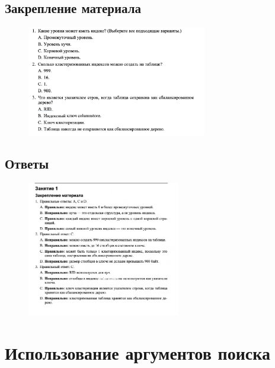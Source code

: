 \subsection*{Закрепление материала}

\begin{figure}[h!]
	\begin{center}
		\includegraphics[width=0.7\textwidth]{img/zakrep43.png}
	\end{center}
	\captionsetup{justification=centering}
\end{figure}
\newpage

\subsection*{Ответы}

\begin{figure}[h!]
	\begin{center}
		\includegraphics[width=0.6\textwidth]{img/ans43.png}
	\end{center}
	\captionsetup{justification=centering}
\end{figure}
\clearpage



\section{Использование аргументов поиска}

